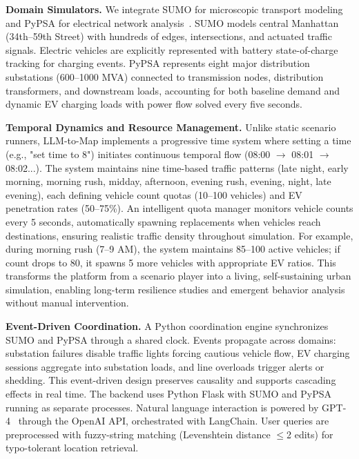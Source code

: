 \documentclass[sigconf,review,nonacm]{acmart}
\begin{document}
\noindent\textbf{Domain Simulators.}
We integrate SUMO for microscopic transport modeling~\cite{lopez2018sumo} and PyPSA for electrical network analysis~\cite{brown2018pypsa}. SUMO models central Manhattan (34th–59th Street) with hundreds of edges, intersections, and actuated traffic signals. Electric vehicles are explicitly represented with battery state-of-charge tracking for charging events. PyPSA represents eight major distribution substations (600–1000 MVA) connected to transmission nodes, distribution transformers, and downstream loads, accounting for both baseline demand and dynamic EV charging loads with power flow solved every five seconds.

\noindent\textbf{Temporal Dynamics and Resource Management.}
Unlike static scenario runners, LLM-to-Map implements a progressive time system where setting a time (e.g., "set time to 8") initiates continuous temporal flow (08:00 $\rightarrow$ 08:01 $\rightarrow$ 08:02...). The system maintains nine time-based traffic patterns (late night, early morning, morning rush, midday, afternoon, evening rush, evening, night, late evening), each defining vehicle count quotas (10–100 vehicles) and EV penetration rates (50–75\%). An intelligent quota manager monitors vehicle counts every 5 seconds, automatically spawning replacements when vehicles reach destinations, ensuring realistic traffic density throughout simulation. For example, during morning rush (7–9 AM), the system maintains 85–100 active vehicles; if count drops to 80, it spawns 5 more vehicles with appropriate EV ratios. This transforms the platform from a scenario player into a living, self-sustaining urban simulation, enabling long-term resilience studies and emergent behavior analysis without manual intervention.

\noindent\textbf{Event-Driven Coordination.}
A Python coordination engine synchronizes SUMO and PyPSA through a shared clock. Events propagate across domains: substation failures disable traffic lights forcing cautious vehicle flow, EV charging sessions aggregate into substation loads, and line overloads trigger alerts or shedding. This event-driven design preserves causality and supports cascading effects in real time. The backend uses Python Flask with SUMO and PyPSA running as separate processes. Natural language interaction is powered by GPT-4~\cite{achiam2023gpt} through the OpenAI API, orchestrated with LangChain. User queries are preprocessed with fuzzy-string matching (Levenshtein distance $\leq$2 edits) for typo-tolerant location retrieval.
\end{document}
